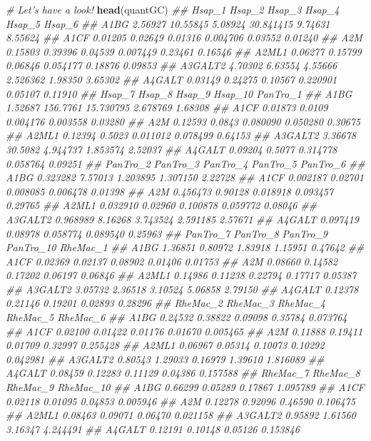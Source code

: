 \documentclass[]{book}
\newenvironment{Shaded}{\begin{snugshade}}{\end{snugshade}}
\newcommand{\CommentTok}[1]{\textcolor[rgb]{0.56,0.35,0.01}{\textit{#1}}}
\newcommand{\KeywordTok}[1]{\textcolor[rgb]{0.13,0.29,0.53}{\textbf{#1}}}
\newcommand{\NormalTok}[1]{#1}
\begin{document}
\begin{Shaded}
\begin{Highlighting}[]
\CommentTok{# Let's have a look!}
\KeywordTok{head}\NormalTok{(quantGC)}
\CommentTok{##          Hsap_1   Hsap_2  Hsap_3    Hsap_4  Hsap_5  Hsap_6}
\CommentTok{## A1BG    2.56927 10.55845 5.08924 30.841415 9.74631 8.55624}
\CommentTok{## A1CF    0.01205  0.02649 0.01316  0.004706 0.03552 0.01240}
\CommentTok{## A2M     0.15803  0.39396 0.04539  0.007449 0.23461 0.16546}
\CommentTok{## A2ML1   0.06277  0.15799 0.06846  0.054177 0.18876 0.09853}
\CommentTok{## A3GALT2 4.70302  6.63554 4.55666  2.526362 1.98350 3.65302}
\CommentTok{## A4GALT  0.03149  0.24275 0.10567  0.220901 0.05107 0.11910}
\CommentTok{##          Hsap_7   Hsap_8    Hsap_9  Hsap_10 PanTro_1}
\CommentTok{## A1BG    1.52687 156.7761 15.730795 2.678769  1.68308}
\CommentTok{## A1CF    0.01873   0.0109  0.004176 0.003558  0.03280}
\CommentTok{## A2M     0.12593   0.0843  0.080090 0.050280  0.30675}
\CommentTok{## A2ML1   0.12394   0.5023  0.011012 0.078499  0.64153}
\CommentTok{## A3GALT2 3.36678  30.5082  4.944737 1.853574  2.52037}
\CommentTok{## A4GALT  0.09204   0.5077  0.314778 0.058764  0.09251}
\CommentTok{##         PanTro_2 PanTro_3 PanTro_4 PanTro_5 PanTro_6}
\CommentTok{## A1BG    0.323282  7.57013 1.203895 1.307150  2.22728}
\CommentTok{## A1CF    0.002187  0.02701 0.008085 0.006478  0.01398}
\CommentTok{## A2M     0.456473  0.90128 0.018918 0.093457  0.29765}
\CommentTok{## A2ML1   0.032910  0.02960 0.100878 0.059772  0.08046}
\CommentTok{## A3GALT2 0.968989  8.16268 3.743524 2.591185  2.57671}
\CommentTok{## A4GALT  0.097419  0.08978 0.058774 0.089540  0.25963}
\CommentTok{##         PanTro_7 PanTro_8 PanTro_9 PanTro_10 RheMac_1}
\CommentTok{## A1BG     1.36851  0.80972  1.83918   1.15951  0.47642}
\CommentTok{## A1CF     0.02369  0.02137  0.08902   0.01406  0.01753}
\CommentTok{## A2M      0.08660  0.14582  0.17202   0.06197  0.06846}
\CommentTok{## A2ML1    0.14986  0.11238  0.22794   0.17717  0.05387}
\CommentTok{## A3GALT2  3.05732  2.36518  3.10524   5.06858  2.79150}
\CommentTok{## A4GALT   0.12378  0.21146  0.19201   0.02893  0.28296}
\CommentTok{##         RheMac_2 RheMac_3 RheMac_4 RheMac_5 RheMac_6}
\CommentTok{## A1BG     0.24532  0.38822  0.09098  0.35784 0.073764}
\CommentTok{## A1CF     0.02100  0.01422  0.01176  0.01670 0.005465}
\CommentTok{## A2M      0.11888  0.19411  0.01709  0.32997 0.255428}
\CommentTok{## A2ML1    0.06967  0.05314  0.10073  0.10292 0.042981}
\CommentTok{## A3GALT2  0.80543  1.29033  0.16979  1.39610 1.816089}
\CommentTok{## A4GALT   0.08459  0.12283  0.11129  0.04386 0.157588}
\CommentTok{##         RheMac_7 RheMac_8 RheMac_9 RheMac_10}
\CommentTok{## A1BG     0.66299  0.05289  0.17867  1.095789}
\CommentTok{## A1CF     0.02118  0.01095  0.04853  0.005946}
\CommentTok{## A2M      0.12278  0.92096  0.46590  0.106475}
\CommentTok{## A2ML1    0.08463  0.09071  0.06470  0.021158}
\CommentTok{## A3GALT2  0.95892  1.61560  3.16347  4.244491}
\CommentTok{## A4GALT   0.12191  0.10148  0.05126  0.153846}


\end{Highlighting}
\end{Shaded}
\end{document}
